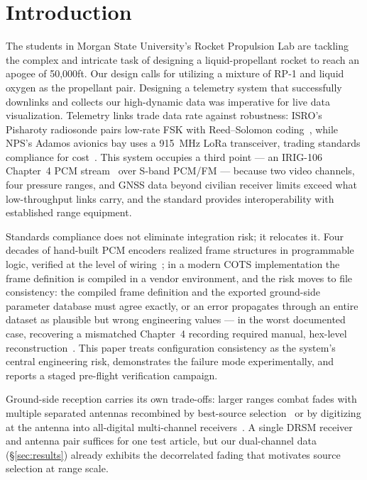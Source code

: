 \documentclass[12pt,letterpaper]{article}
\begin{document}
\section{Introduction}


The students in Morgan State University's Rocket Propulsion Lab are tackling the complex and intricate task of designing a liquid-propellant rocket to reach an apogee of 50,000ft. Our design calls for utilizing a mixture of RP-1 and liquid oxygen as the propellant pair. Designing a telemetry system that successfully downlinks and collects our high-dynamic data was imperative for live data visualization. Telemetry links trade data rate against robustness: ISRO's Pisharoty
radiosonde pairs low-rate FSK with Reed--Solomon coding~\cite{divya2014},
while NPS's Adamos avionics bay uses a 915~MHz LoRa transceiver, trading
standards compliance for cost~\cite{adamos2021}. This system occupies a
third point --- an IRIG-106 Chapter~4 PCM stream~\cite{irig106} over
S-band PCM/FM --- because two video channels, four pressure ranges, and
GNSS data beyond civilian receiver limits exceed what low-throughput
links carry, and the standard provides interoperability with established
range equipment.

Standards compliance does not eliminate integration risk; it relocates
it. Four decades of hand-built PCM encoders realized frame structures in
programmable logic, verified at the level of
wiring~\cite{rochefort1991,salib2024}; in a modern COTS implementation
the frame definition is compiled in a vendor environment, and the risk
moves to file consistency: the compiled frame definition and the exported
ground-side parameter database must agree exactly, or an error propagates
through an entire dataset as plausible but wrong engineering values ---
in the worst documented case, recovering a mismatched Chapter~4 recording
required manual, hex-level reconstruction~\cite{rettig2017}. This paper
treats configuration consistency as the system's central engineering
risk, demonstrates the failure mode experimentally, and reports a staged
pre-flight verification campaign.

Ground-side reception carries its own trade-offs: larger ranges combat
fades with multiple separated antennas recombined by best-source
selection~\cite{bastie2022} or by digitizing at the antenna into
all-digital multi-channel receivers~\cite{bastie2024}. A single DRSM
receiver and antenna pair suffices for one test article, but our
dual-channel data (\S\ref{sec:results}) already exhibits the
decorrelated fading that motivates source selection at range
scale.
\end{document}
